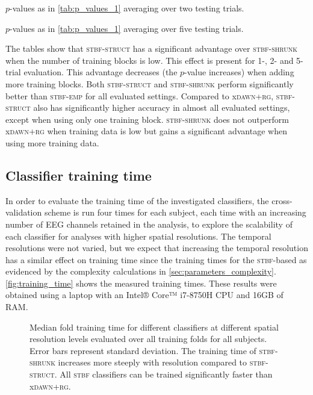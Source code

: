 \begin{refsection}
\begin{table}[h]
		\centering
		
		\caption{$p$-values as in \autoref{tab:p_values_1} averaging over two testing trials.}
		\label{tab:p_values_2}

		\centering
		
		\caption{$p$-values as in \autoref{tab:p_values_1} averaging over five testing trials.}
		\label{tab:p_values_5}
	\end{table}
	\unskip

	The tables show that \textsc{stbf-struct} has a significant advantage over
	\textsc{stbf-shrunk} when the number of training blocks is low.
	This effect is present for 1-, 2- and 5-trial evaluation.
	This advantage decreases (the $p$-value increases) when
	adding more training blocks.
	Both \textsc{stbf-struct} and \textsc{stbf-shrunk} perform significantly better
	than \textsc{stbf-emp} for all evaluated settings.
	Compared to x\textsc{dawn+rg}, \textsc{stbf-struct} also has significantly
	higher accuracy in almost all evaluated settings, except when using only one training block.
	\textsc{stbf-shrunk} does not outperform x\textsc{dawn+rg} when training data is low but gains a significant advantage
	when using more training data.

	\subsection{Classifier training time}
	In order to evaluate the training time of the investigated classifiers, the
	cross-validation scheme is run four times for each subject, each time with an
	increasing number of EEG channels retained in the analysis, to explore the scalability of each classifier for analyses with higher spatial resolutions.
	The temporal resolutions were not varied, but we expect that increasing the
	temporal resolution has a similar effect on training time since the
	training times for the \textsc{stbf}-based as evidenced by the complexity
	calculations in \autoref{sec:parameters_complexity}.
	\autoref{fig:training_time} shows the measured training times.
	These results were obtained using a laptop with an Intel® Core™ i7-8750H CPU and 16GB of RAM.

	\begin{figure}
		\caption{Median fold training time for different classifiers at different spatial
			resolution levels evaluated over all training folds for all subjects.
			Error bars represent standard deviation. The training time of \textsc{stbf-shrunk} increases more
			steeply with resolution compared to \textsc{stbf-struct}.
			All \textsc{stbf} classifiers can be trained significantly faster than
			x\textsc{dawn+rg}.}
		\label{fig:training_time}
	\end{figure}


\end{refsection}
